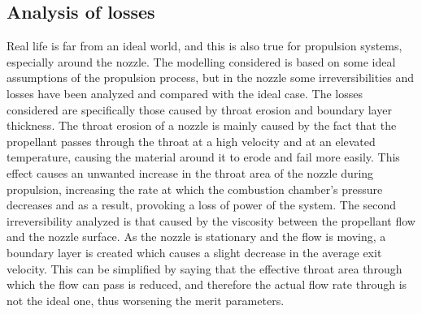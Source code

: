 \subsection{Analysis of losses}
\label{subsec:losses_intro}
Real life is far from an ideal world, and this is also true for propulsion systems, especially around the nozzle. The modelling considered is based on some ideal assumptions of the propulsion process, but in the nozzle some irreversibilities and losses have been analyzed and compared with the ideal case. The losses considered are specifically those caused by throat erosion and boundary layer thickness\cite{Sutton}. The throat erosion of a nozzle is mainly caused by the fact that the propellant passes through the throat at a high velocity and at an elevated temperature, causing the material around it to erode and fail more easily. This effect causes an unwanted increase in the throat area of the nozzle during propulsion, increasing the rate at which the combustion chamber's pressure decreases and as a result, provoking a loss of power of the system. The second irreversibility analyzed is that caused by the viscosity between the propellant flow and the nozzle surface. As the nozzle is stationary and the flow is moving, a boundary layer is created which causes a slight decrease in the average exit velocity. This can be simplified by saying that the effective throat area through which the flow can pass is reduced, and therefore the actual flow rate through is not the ideal one, thus worsening the merit parameters\cite{slides_maggi}.
